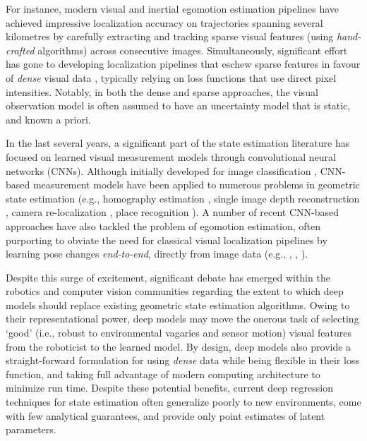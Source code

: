 For instance, modern visual and inertial egomotion estimation pipelines \citep{Leutenegger2015-fk, Cvisic2015-mt, Tsotsos2015-qs} have achieved impressive localization accuracy on trajectories spanning several kilometres by carefully extracting and tracking sparse visual features (using \textit{hand-crafted} algorithms) across consecutive images. Simultaneously, significant effort has gone to developing localization pipelines that eschew sparse features in favour of  \textit{dense} visual data \citep{Alcantarilla2016-kv, Forster2014-bm},  typically relying on loss functions that use direct pixel intensities. Notably, in both the dense and sparse approaches, the visual observation model is often assumed to have an uncertainty model that is static, and known a priori. %

In the last several years, a significant part of the state estimation literature has focused on learned visual measurement models through convolutional neural networks (CNNs). Although initially developed for image classification  \citep{LeCun2015-qf}, CNN-based measurement models have been applied to numerous problems in geometric state estimation (e.g., homography estimation \citep{DeTone2016-ue}, single image depth reconstruction \citep{Garg2016-ip},  camera re-localization \citep{Kendall2016-zf}, place recognition \citep{Sunderhauf2015-is}). A number of recent CNN-based approaches have also tackled the problem of egomotion estimation, often purporting to obviate the need for classical visual localization pipelines by learning pose changes \textit{end-to-end}, directly from image data (e.g., \cite{Melekhov2017-dl}, \cite{Handa2016-hm}, \cite{Oliveira2017-lt}).

Despite this surge of excitement, significant debate has emerged within the robotics and computer vision communities regarding the extent to which deep models should replace existing geometric state estimation algorithms. Owing to their representational power, deep models may move the onerous task of selecting `good' (i.e., robust to environmental vagaries and sensor motion) visual features from the roboticist to the learned model. By design, deep models also provide a straight-forward formulation for using \textit{dense} data while being flexible in their loss function, and taking full advantage of modern computing architecture to minimize run time. Despite these potential benefits, current deep regression techniques for state estimation often generalize poorly to new environments, come with few analytical guarantees, and provide only point estimates of latent parameters.


